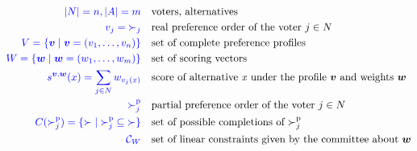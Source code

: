\documentclass[blockverticalspace=3cm]{tikzposter}
\newcommand{\profile}{\bm{v}}%
\newcommand{\pprofile}{{\bm{p}}}%
\newcommand{\w}{\bm{w}}
\newcommand{\Co}{\mathcal{C}}
\newcommand{\ppref}{\succ^\text{p}}%
\DeclareMathOperator{\Regret}{Regret}
\DeclareMathOperator{\PMR}{PMR}
\DeclareMathOperator{\MR}{MR}
\DeclareMathOperator{\MMR}{MMR}
\begin{document}
\begin{columns}
{			\begin{align*}
				\color{blue}{|N|=n, |A|=m} \quad &\text{voters, alternatives} \\
				\color{blue}{v_j =  {\succ_j}} \quad &\text{real preference order of the voter $j \in N$ }\\ 
				\color{blue}{V=\{\profile \mid \profile=(v_1, \dots, v_n)\}} \quad & \text{set of complete preference profiles} \\
				\color{blue}{W=\{\w \mid \w=(w_1, \dots, w_m)\}} \quad & \text{set of scoring vectors} \\
				\color{blue}{s^{\profile, \w}(x) = \sum_{j \in N} w_{v_j(x)}} \quad & \text{score of alternative \textit{x} under the profile $\profile$ and weights $\w$} \\
				\color{blue}{\ppref_j} \quad & \text{partial preference order of the voter $j \in N$} \\
				\color{blue}{C(\ppref_j)=\set{{\succ} \mid {\ppref_j} \subseteq {\succ}}} \quad & \text{set of possible completions of $\ppref_j$} \\
				\color{blue}{\Co_W} \quad& \text{set of linear constraints given by the committee about $\w$}
			\end{align*}
		}
\end{columns}
\end{document}

